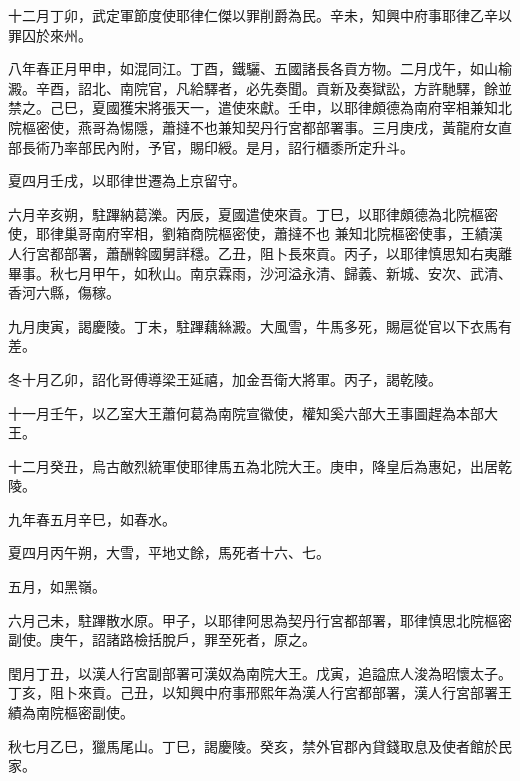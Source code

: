 \begin{pinyinscope}
 十二月丁卯，武定軍節度使耶律仁傑以罪削爵為民。辛未，知興中府事耶律乙辛以罪囚於來州。



 八年春正月甲申，如混同江。丁酉，鐵驪、五國諸長各貢方物。二月戊午，如山榆澱。辛酉，詔北、南院官，凡給驛者，必先奏聞。貢新及奏獄訟，方許馳驛，餘並禁之。己巳，夏國獲宋將張天一，遣使來獻。壬申，以耶律頗德為南府宰相兼知北院樞密使，燕哥為惕隱，蕭撻不也兼知契丹行宮都部署事。三月庚戌，黃龍府女直部長術乃率部民內附，予官，賜印綬。是月，詔行櫃黍所定升斗。



 夏四月壬戌，以耶律世遷為上京留守。



 六月辛亥朔，駐蹕納葛濼。丙辰，夏國遣使來貢。丁巳，以耶律頗德為北院樞密使，耶律巢哥南府宰相，劉箱商院樞密使，蕭撻不也
 兼知北院樞密使事，王績漢人行宮都部署，蕭酬斡國舅詳穩。乙丑，阻卜長來貢。丙子，以耶律慎思知右夷離畢事。秋七月甲午，如秋山。南京霖雨，沙河溢永清、歸義、新城、安次、武清、香河六縣，傷稼。



 九月庚寅，謁慶陵。丁未，駐蹕藕絲澱。大風雪，牛馬多死，賜扈從官以下衣馬有差。



 冬十月乙卯，詔化哥傅導梁王延禧，加金吾衛大將軍。丙子，謁乾陵。



 十一月壬午，以乙室大王蕭何葛為南院宣徽使，權知奚六部大王事圖趕為本部大王。



 十二月癸丑，烏古敵烈統軍使耶律馬五為北院大王。庚申，降皇后為惠妃，出居乾陵。



 九年春五月辛巳，如春水。



 夏四月丙午朔，大雪，平地丈餘，馬死者十六、七。



 五月，如黑嶺。



 六月己未，駐蹕散水原。甲子，以耶律阿思為契丹行宮都部署，耶律慎思北院樞密副使。庚午，詔諸路檢括脫戶，罪至死者，原之。



 閏月丁丑，以漢人行宮副部署可漢奴為南院大王。戊寅，追謚庶人浚為昭懷太子。丁亥，阻卜來貢。己丑，以知興中府事邢熙年為漢人行宮都部署，漢人行宮部署王績為南院樞密副使。



 秋七月乙巳，獵馬尾山。丁巳，謁慶陵。癸亥，禁外官郡內貸錢取息及使者館於民家。




\end{pinyinscope}
